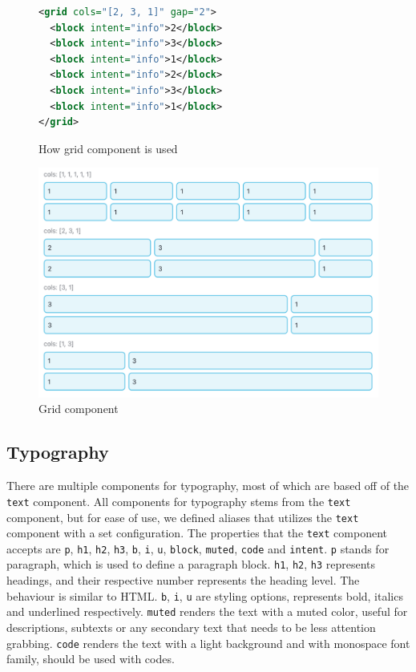\begin{figure}
\begin{minipage}{\linewidth}
\begin{lstlisting}[language=xml]
<grid cols="[2, 3, 1]" gap="2">
  <block intent="info">2</block>
  <block intent="info">3</block>
  <block intent="info">1</block>
  <block intent="info">2</block>
  <block intent="info">3</block>
  <block intent="info">1</block>
</grid>
\end{lstlisting}
\end{minipage}
\caption{How grid component is used}%
\label{fig:grid_xml}%
\end{figure}

\begin{figure}
  \centering
  \includegraphics[width=13cm]{thesis/paper/images/grid.png}
  \caption{Grid component}%
  \label{fig:grid}%
\end{figure}

\subsection{Typography}

There are multiple components for typography, most of which are based off of the \texttt{text} component. All components for typography stems from the \texttt{text} component, but for ease of use, we defined aliases that utilizes the \texttt{text} component with a set configuration. The properties that the \texttt{text} component accepts are \texttt{p}, \texttt{h1}, \texttt{h2}, \texttt{h3}, \texttt{b}, \texttt{i}, \texttt{u}, \texttt{block}, \texttt{muted}, \texttt{code} and \texttt{intent}. \texttt{p} stands for paragraph, which is used to define a paragraph block. \texttt{h1}, \texttt{h2}, \texttt{h3} represents headings, and their respective number represents the heading level. The behaviour is similar to HTML. \texttt{b}, \texttt{i}, \texttt{u} are styling options, represents bold, italics and underlined respectively. \texttt{muted} renders the text with a muted color, useful for descriptions, subtexts or any secondary text that needs to be less attention grabbing. \texttt{code} renders the text with a light background and with monospace font family, should be used with codes. 

